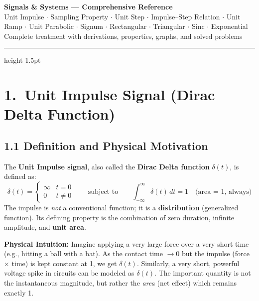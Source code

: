 \documentclass[10pt,a4paper]{article}
\begin{document}
\begin{center}
  {\LARGE\bfseries\color{headcolor} Signals \& Systems --- Comprehensive Reference}\\[3pt]
  {\small Unit Impulse $\cdot$ Sampling Property $\cdot$ Unit Step $\cdot$ Impulse--Step Relation
    $\cdot$ Unit Ramp $\cdot$ Unit Parabolic $\cdot$ Signum $\cdot$ Rectangular $\cdot$ Triangular
    $\cdot$ Sinc $\cdot$ Exponential}\\[2pt]
  {\footnotesize\color{gray} Complete treatment with derivations, properties, graphs, and solved problems}
\end{center}
\vspace{2pt}\hrule height 1.5pt\vspace{4pt}

\section{1.\ Unit Impulse Signal (Dirac Delta Function)}

\subsection*{1.1 Definition and Physical Motivation}

\begin{defbox}
The \textbf{Unit Impulse signal}, also called the \textbf{Dirac Delta function} $\delta(t)$, is defined as:
\[
\delta(t) = \begin{cases} \infty & t=0 \\ 0 & t\neq0 \end{cases}
\qquad\text{subject to}\qquad
\int_{-\infty}^{\infty}\delta(t)\,dt = 1 \quad\text{(area = 1, always)}
\]
The impulse is \emph{not} a conventional function; it is a \textbf{distribution} (generalized function). Its defining property is the combination of zero duration, infinite amplitude, and \textbf{unit area}.
\end{defbox}

\begin{intuitbox}
\textbf{Physical Intuition:} Imagine applying a very large force over a very short time (e.g., hitting a ball with a bat). As the contact time $\to 0$ but the impulse (force $\times$ time) is kept constant at 1, we get $\delta(t)$. Similarly, a very short, powerful voltage spike in circuits can be modeled as $\delta(t)$. The important quantity is not the instantaneous magnitude, but rather the \textit{area} (net effect) which remains exactly 1.
\end{intuitbox}
\end{document}
